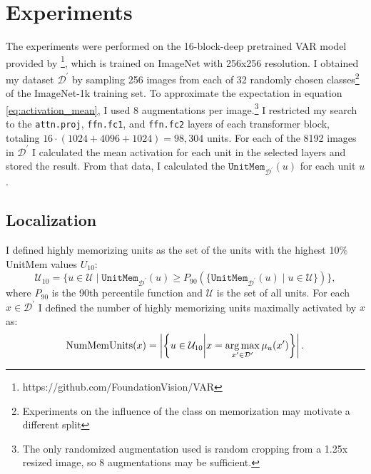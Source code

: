 \documentclass{article} %
\begin{document}
\section{Experiments}
The experiments were performed on the 16-block-deep pretrained VAR model provided by \citet{tianVisualAutoregressiveModeling2024}\footnote{https://github.com/FoundationVision/VAR}, which is trained on ImageNet with 256x256 resolution.
I obtained my dataset $\mathcal{D}^\prime$ by sampling 256 images from each of 32 randomly chosen classes\footnote{Experiments on the influence of the class on memorization may motivate a different split} of the ImageNet-1k training set.
To approximate the expectation in equation \ref{eq:activation_mean}, I used 8 augmentations per image.\footnote{The only randomized augmentation used is random cropping from a 1.25x resized image, so 8 augmentations may be sufficient.}
I restricted my search to the \texttt{attn.proj}, \texttt{ffn.fc1}, and \texttt{ffn.fc2} layers of each transformer block, totaling $16\cdot (1024 + 4096 + 1024) = 98,304$ units.
For each of the 8192 images in $\mathcal{D}^\prime$ I calculated the mean activation for each unit in the selected layers and stored the result.
From that data, I calculated the $\texttt{UnitMem}_{\mathcal{D}^\prime}(u)$ for each unit $u$.
\subsection{Localization}
I defined highly memorizing units as the set of the units with the highest 10\% UnitMem values $U_{10}$:
\begin{equation}\label{eq:mem_units}
   \mathcal{U}_{10} = \{u \in \mathcal{U} \mid\texttt{UnitMem}_{\mathcal{D}^\prime}(u) \geq P_{90}(\{\texttt{UnitMem}_{\mathcal{D}^\prime}(u) \mid u \in \mathcal{U}\})\},
\end{equation}
where $P_{90}$ is the 90th percentile function and $\mathcal{U}$ is the set of all units.
For each $x \in \mathcal{D}^\prime$ I defined the number of highly memorizing units maximally activated by $x$ as:
\[\text{NumMemUnits}(x) = \left|\left\{u \in \mathcal{U}_{10} \middle| x = \operatorname*{arg\,max}_{x^\prime \in \mathcal{D}^\prime}\mu_u(x^\prime)\right\}\right|.\]
\end{document}
